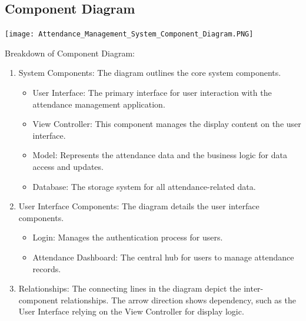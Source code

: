 \documentclass[a4paper, 12pt]{article}
\begin{document}
\subsection{Component Diagram}
\begin{center}
\texttt{[image: Attendance\_Management\_System\_Component\_Diagram.PNG]}\par
\end{center}
Breakdown of Component Diagram:
\begin{enumerate}
    \item System Components: The diagram outlines the core system components.
    \begin{itemize}
        \item User Interface: The primary interface for user interaction with the attendance management application.
        \item View Controller: This component manages the display content on the user interface.
        \item Model: Represents the attendance data and the business logic for data access and updates.
        \item Database: The storage system for all attendance-related data.
    \end{itemize}
    \item User Interface Components: The diagram details the user interface components.
    \begin{itemize}
        \item Login: Manages the authentication process for users.
        \item Attendance Dashboard: The central hub for users to manage attendance records.
    \end{itemize}
    \item Relationships: The connecting lines in the diagram depict the inter-component relationships. The arrow direction shows dependency, such as the User Interface relying on the View Controller for display logic.
\end{enumerate}
\end{document}
